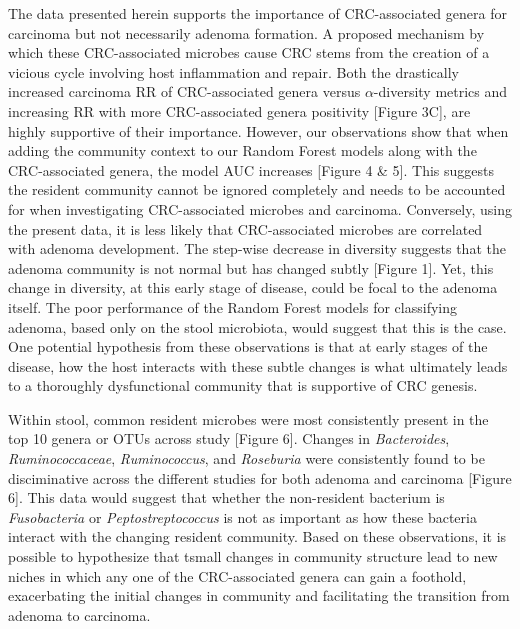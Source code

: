 \documentclass[12pt,]{article}
\begin{document}
The data presented herein supports the importance of CRC-associated
genera for carcinoma but not necessarily adenoma formation. A proposed
mechanism by which these CRC-associated microbes cause CRC stems from
the creation of a vicious cycle involving host inflammation and repair.
Both the drastically increased carcinoma RR of CRC-associated genera
versus \(\alpha\)-diversity metrics and increasing RR with more
CRC-associated genera positivity {[}Figure 3C{]}, are highly supportive
of their importance. However, our observations show that when adding the
community context to our Random Forest models along with the
CRC-associated genera, the model AUC increases {[}Figure 4 \& 5{]}. This
suggests the resident community cannot be ignored completely and needs
to be accounted for when investigating CRC-associated microbes and
carcinoma. Conversely, using the present data, it is less likely that
CRC-associated microbes are correlated with adenoma development. The
step-wise decrease in diversity suggests that the adenoma community is
not normal but has changed subtly {[}Figure 1{]}. Yet, this change in
diversity, at this early stage of disease, could be focal to the adenoma
itself. The poor performance of the Random Forest models for classifying
adenoma, based only on the stool microbiota, would suggest that this is
the case. One potential hypothesis from these observations is that at
early stages of the disease, how the host interacts with these subtle
changes is what ultimately leads to a thoroughly dysfunctional community
that is supportive of CRC genesis.

Within stool, common resident microbes were most consistently present in
the top 10 genera or OTUs across study {[}Figure 6{]}. Changes in
\emph{Bacteroides}, \emph{Ruminococcaceae}, \emph{Ruminococcus}, and
\emph{Roseburia} were consistently found to be disciminative across the
different studies for both adenoma and carcinoma {[}Figure 6{]}. This
data would suggest that whether the non-resident bacterium is
\emph{Fusobacteria} or \emph{Peptostreptococcus} is not as important as
how these bacteria interact with the changing resident community. Based
on these observations, it is possible to hypothesize that tsmall changes
in community structure lead to new niches in which any one of the
CRC-associated genera can gain a foothold, exacerbating the initial
changes in community and facilitating the transition from adenoma to
carcinoma.
\end{document}

